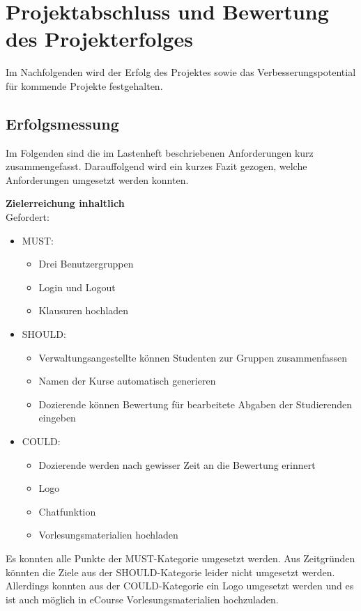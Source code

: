 \chapter{Projektabschluss und Bewertung des Projekterfolges}

\label{sec:Chap7}

Im Nachfolgenden wird der Erfolg des Projektes sowie das Verbesserungspotential für kommende Projekte festgehalten.

\section{Erfolgsmessung}
Im Folgenden sind die im Lastenheft beschriebenen Anforderungen kurz zusammengefasst. Darauffolgend wird ein kurzes Fazit gezogen, welche Anforderungen umgesetzt werden konnten.

\textbf{Zielerreichung inhaltlich} \\
Gefordert:
\begin{itemize}
\item MUST:
\begin{itemize}
\item Drei Benutzergruppen
\item Login und Logout
\item Klausuren hochladen
\end{itemize}
\item SHOULD:
\begin{itemize}
\item Verwaltungsangestellte können Studenten zur Gruppen zusammenfassen
\item Namen der Kurse automatisch generieren
\item Dozierende können Bewertung für bearbeitete Abgaben der Studierenden eingeben
\end{itemize}
\item COULD:
\begin{itemize}
\item Dozierende werden nach gewisser Zeit an die Bewertung erinnert
\item Logo
\item Chatfunktion
\item Vorlesungsmaterialien hochladen
\end{itemize}
\end{itemize}

Es konnten alle Punkte der MUST-Kategorie umgesetzt werden. Aus Zeitgründen könnten die Ziele aus der SHOULD-Kategorie leider nicht umgesetzt werden. Allerdings konnten aus der COULD-Kategorie ein Logo umgesetzt werden und es ist auch möglich in eCourse Vorlesungsmaterialien hochzuladen.

